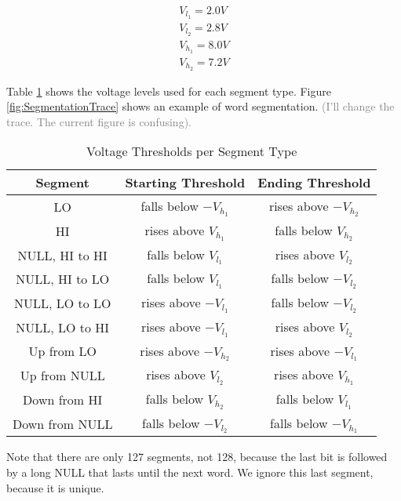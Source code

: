 \documentclass[conference]{IEEEtran}
\begin{document}
  \begin{align*}
    V_{l_1} = 2.0V \\
    V_{l_2} = 2.8V \\
    V_{h_1} = 8.0V \\
    V_{h_2} = 7.2V 
  \end{align*}
  
  Table \ref{tab:SegmentationLevels} shows the voltage levels used for each segment type. Figure \ref{fig:SegmentationTrace} shows an example of word segmentation. \textcolor{gray}{(I'll change the trace. The current figure is confusing).}
  
  \begin{table}
    \caption{Voltage Thresholds per Segment Type}
    \label{tab:SegmentationLevels}
    \centering
    \begin{tabular}{|c c c|} 
      \hline
      Segment & Starting Threshold & Ending Threshold \\ [0.5ex] 
      \hline\hline
      LO & falls below $-V_{h_1}$ & rises above $-V_{h_2}$ \\
      \hline
      HI & rises above $V_{h_1}$ & falls below $V_{h_2}$ \\
      \hline
      NULL, HI to HI & falls below $V_{l_1}$ & rises above $V_{l_2}$ \\
      \hline
      NULL, HI to LO & falls below $V_{l_1}$ & falls below $-V_{l_2}$ \\
      \hline
      NULL, LO to LO & rises above $-V_{l_1}$ & falls below $-V_{l_2}$ \\
      \hline
      NULL, LO to HI & rises above $-V_{l_1}$ & rises above $V_{l_2}$ \\
      \hline
      Up from LO & rises above $-V_{h_2}$ & rises above $-V_{l_1}$ \\
      \hline
      Up from NULL & rises above $V_{l_2}$ & rises above $V_{h_1}$ \\
      \hline
      Down from HI & falls below $V_{h_2}$ & falls below $V_{l_1}$ \\
      \hline
      Down from NULL & falls below $-V_{l_2}$ & falls below $-V_{h_1}$ \\
      \hline
    \end{tabular}
  \end{table}
  
  Note that there are only 127 segments, not 128, because the last bit is followed by a long NULL that lasts until the next word. We ignore this last segment, because it is unique.
  
\end{document}
